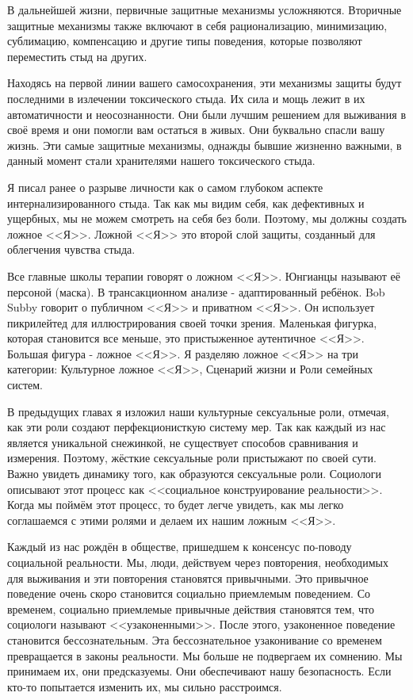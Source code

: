 \documentclass[10pt, fleqn]{article}
\begin{document}
В дальнейшей жизни, первичные защитные механизмы усложняются. Вторичные защитные механизмы также включают в себя рационализацию, минимизацию, сублимацию, компенсацию и другие типы поведения, которые позволяют переместить стыд на других.

Находясь на первой линии вашего самосохранения, эти механизмы защиты будут последними в излечении токсического стыда. Их сила и мощь лежит в их автоматичности и неосознанности. Они были лучшим решением для выживания в своё время и они помогли вам остаться в живых. Они буквально спасли вашу жизнь. Эти самые защитные механизмы, однажды бывшие жизненно важными, в данный момент стали хранителями нашего токсического стыда.


Я писал ранее о разрыве личности как о самом глубоком аспекте интернализированного стыда. Так как мы видим себя, как дефективных и ущербных, мы не можем смотреть на себя без боли. Поэтому, мы должны создать ложное <<Я>>. Ложной <<Я>> это второй слой защиты, созданный для облегчения чувства стыда.


Все главные школы терапии говорят о ложном <<Я>>. Юнгианцы называют её персоной (маска). В трансакционном анализе - адаптированный ребёнок.
Bob Subby говорит о публичном <<Я>> и приватном <<Я>>. Он использует пикрилейтед для иллюстрирования своей точки зрения. Маленькая фигурка, которая становится все меньше, это пристыженное аутентичное <<Я>>. Большая фигура - ложное <<Я>>.
Я разделяю ложное <<Я>> на три категории: Культурное ложное <<Я>>, Сценарий жизни и Роли семейных систем.


В предыдущих главах я изложил наши культурные сексуальные роли, отмечая, как эти роли создают перфекционисткую систему мер. Так как каждый из нас является уникальной снежинкой, не существует способов сравнивания и измерения. Поэтому, жёсткие сексуальные роли пристыжают по своей сути.
Важно увидеть динамику того, как образуются сексуальные роли. Социологи описывают этот процесс как <<социальное конструирование реальности>>. Когда мы поймём этот процесс, то будет легче увидеть, как мы легко соглашаемся с этими ролями и делаем их нашим ложным <<Я>>.


Каждый из нас рождён в обществе, пришедшем к консенсус по-поводу социальной реальности.
Мы, люди, действуем через повторения, необходимых для выживания и эти повторения становятся привычными. Это привычное поведение очень скоро становится социально приемлемым поведением. Со временем, социально приемлемые привычные действия становятся тем, что социологи называют <<узаконенными>>. После этого, узаконенное поведение становится бессознательным. Эта бессознательное узаконивание со временем превращается в законы реальности. Мы больше не подвергаем их сомнению. Мы принимаем их, они предсказуемы. Они обеспечивают нашу безопасность. Если кто-то попытается изменить их, мы сильно расстроимся.
\end{document}
